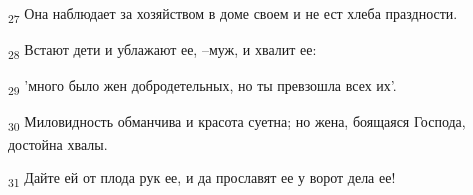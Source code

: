 \begin{tcolorbox}
\textsubscript{27} Она наблюдает за хозяйством в доме своем и не ест хлеба праздности.
\end{tcolorbox}
\begin{tcolorbox}
\textsubscript{28} Встают дети и ублажают ее, --муж, и хвалит ее:
\end{tcolorbox}
\begin{tcolorbox}
\textsubscript{29} 'много было жен добродетельных, но ты превзошла всех их'.
\end{tcolorbox}
\begin{tcolorbox}
\textsubscript{30} Миловидность обманчива и красота суетна; но жена, боящаяся Господа, достойна хвалы.
\end{tcolorbox}
\begin{tcolorbox}
\textsubscript{31} Дайте ей от плода рук ее, и да прославят ее у ворот дела ее!
\end{tcolorbox}
